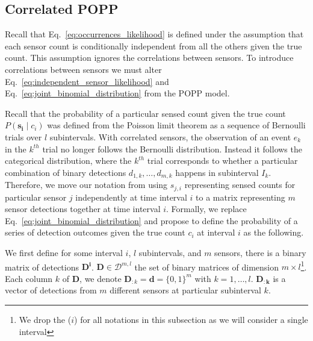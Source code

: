 
\subsection{Correlated POPP}
\label{subsec:cpop}

Recall that Eq.~\ref{eq:occurrences_likelihood} is defined under the assumption that each sensor count is conditionally independent from all the others given the true count. This assumption ignores the correlations between sensors. 
% 
To introduce correlations between sensors we must alter Eq.~\ref{eq:independent_sensor_likelihood} and
Eq.~\ref{eq:joint_binomial_distribution} from the POPP model.


Recall that the probability of a particular sensed count given the true count $P(\mathbf{s_i} \mid c_i)$ was defined from the Poisson limit theorem as a sequence of Bernoulli trials over $l$ subintervals. With correlated sensors, the observation of an event $e_k$ in the $k^{th}$ trial no longer follows the Bernoulli distribution. Instead it follows the categorical distribution, where the $k^{th}$ trial corresponds to whether a particular combination of binary detections $d_{1,k}, \ldots, d_{m,k}$ happens in subinterval $I_k$. Therefore, we move our notation from using $s_{j, i}$ representing sensed counts for particular sensor $j$ independently at time interval $i$ to a matrix representing $m$ sensor detections together at time interval $i$. Formally, we replace Eq.~\ref{eq:joint_binomial_distribution} and propose to define the probability of a series of detection outcomes given the true count $c_i$ at interval $i$ as the following.

We first define for some interval $i$, $l$ subintervals, and $m$ sensors, there is a binary matrix of detections $\mathbf{D^i}$. $\mathbf{D} \in \mathcal{D}^{m , l}$ the set of binary matrices of dimension $m \times l$\footnote{We drop the ($i$) for all notations in this subsection as we will consider a single interval}. Each column $k$ of $\mathbf{D}$, we denote $\mathbf{D}_{:k} = \mathbf{d} = \{0, 1\}^m$ with $k = 1, \ldots, l$. $\mathbf{D_{:k}}$ is a vector of detections from $m$ different sensors at particular subinterval $k$. 

